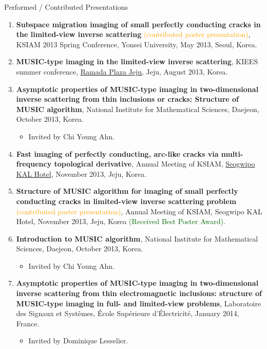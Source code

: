 \documentclass{resume} %
\begin{document}
\begin{rSection}{Performed / Contributed Presentations}
\begin{enumerate}
\item\label{P-KSIAM2013C} \textbf{Subspace migration imaging of small perfectly conducting cracks in the limited-view inverse scattering} \textcolor{orange}{(contributed poster presentation)}, KSIAM 2013 Spring Conference, Yonsei University, May 2013, Seoul, Korea.
\item\label{P-KIEES2013} \textbf{MUSIC-type imaging in the limited-view inverse scattering}, KIEES summer conference, \href{http://www.ramadajeju.co.kr/eng/}{Ramada Plaza Jeju}, Jeju, August 2013, Korea.
\item\label{P-NIMS2013A} \textbf{Asymptotic properties of MUSIC-type imaging in two-dimensional inverse scattering from thin inclusions or cracks: Structure of MUSIC algorithm}, National Institute for Mathematical Sciences, Daejeon, October 2013, Korea.
    \begin{itemize}
\item Invited by Chi Young Ahn.
\end{itemize}
\item\label{P-KSIAM2013D} \textbf{Fast imaging of perfectly conducting, arc-like cracks via multi-frequency topological derivative}, Annual Meeting of KSIAM, \href{http://www.kalhotel.co.kr/seogwipo/}{Seogwipo KAL Hotel}, November 2013, Jeju, Korea.
\item\label{P-KSIAM2013E} \textbf{Structure of MUSIC algorithm for imaging of small perfectly conducting cracks in limited-view inverse scattering problem} \textcolor{orange}{(contributed poster presentation)}, Annual Meeting of KSIAM, Seogwipo KAL Hotel, November 2013, Jeju, Korea \textcolor{darkgreen}{(Received Best Poster Award)}.
\item\label{P-NIMS2013B} \textbf{Introduction to MUSIC algorithm}, National Institute for Mathematical Sciences, Daejeon, October 2013, Korea.
    \begin{itemize}
\item Invited by Chi Young Ahn.
\end{itemize}
\item\label{P-SUPELEC2014A} \textbf{Asymptotic properties of MUSIC-type imaging in two-dimensional inverse scattering from thin electromagnetic inclusions: structure of MUSIC-type imaging in full- and limited-view problems}, Laboratoire des Signaux et Syst\`emes, \'Ecole Sup\'erieure d'\'Electricit\'e, January 2014, France.
\begin{itemize}
\item Invited by Dominique Lesselier.
\end{itemize}

\end{enumerate}
\end{rSection}
\end{document}
